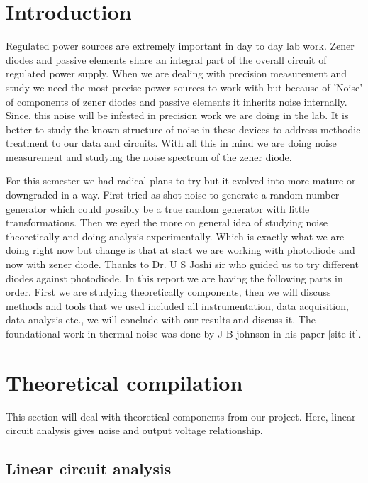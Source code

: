 \documentclass[final,5p,12pt,twocolumn]{elsaarticle}
\begin{document}


\section{Introduction}\label{introduction}

Regulated power sources are extremely important in day to day lab work. Zener diodes and passive elements share an integral part of the overall circuit of regulated power supply.  When we are dealing with precision measurement and study we need the most precise power sources to work with but because of 'Noise' of components of zener diodes and passive elements it inherits noise internally. Since, this noise will be infested in precision work we are doing in the lab. It is better to study the known structure of noise in these devices to address methodic treatment to our data and circuits. With all this in mind we are doing noise measurement and studying the noise spectrum of the zener diode.

For this semester we had radical plans to try but it evolved into more mature or downgraded in a way. First tried as shot noise to generate a random number generator which could possibly be a true random generator with little transformations. Then we eyed the more on general idea of studying noise theoretically and doing analysis experimentally. Which is exactly what we are doing right now but change is that at start we are working with photodiode and now with zener diode. Thanks to Dr. U S Joshi sir who guided us to try different diodes against photodiode. In this report we are having the following parts in order. First we are studying theoretically components, then we will discuss methods and tools that we used included all instrumentation, data acquisition, data analysis etc., we will conclude with our results and discuss it. The foundational work in thermal noise was done by J B johnson in his paper [site it]. 




\section{Theoretical compilation}\label{Theory}

This section will deal with theoretical components from our project. Here, linear circuit analysis gives noise and output voltage relationship. 

\subsection{Linear circuit analysis \label{lca}}
\end{document}
